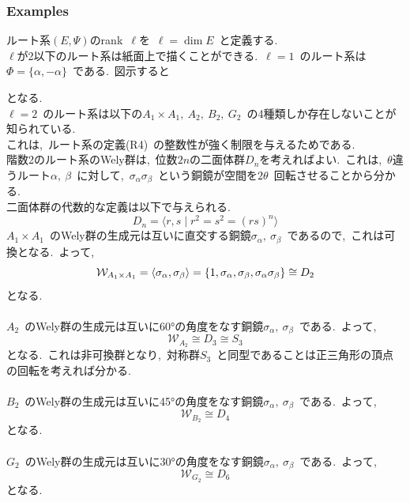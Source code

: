 \documentclass[uplatex,dvipdfmx]{jsarticle}
\begin{document}
\subsubsection{Examples}
ルート系$(E,\Psi)$のrank~$\ell$を~$\ell = \dim E$~と定義する.~\\
$\ell$が2以下のルート系は紙面上で描くことができる.~$\ell = 1$~のルート系は$\Phi = \{\alpha, -\alpha\}$~である.~図示すると
\begin{center}
\end{center}
となる.\\
$\ell = 2$~のルート系は以下の$A_1 \times A_1,~A_2,~B_2,~G_2$~の4種類しか存在しないことが知られている.\\
これは,~ルート系の定義(R4)~の整数性が強く制限を与えるためである.\\
階数2のルート系のWely群は,~位数$2n$の二面体群$D_{n}$を考えればよい.~これは,~$\theta$違うルート$\alpha,~\beta$~に対して,~$\sigma_\alpha \sigma_\beta$~という銅鏡が空間を$2\theta$~回転させることから分かる.\\
二面体群の代数的な定義は以下で与えられる.
\begin{equation*}
        D_{n} = \langle r, s \mid r^2 = s^2 = (rs)^n  \rangle
\end{equation*}
$A_1 \times A_1$~のWely群の生成元は互いに直交する銅鏡$\sigma_\alpha,~\sigma_\beta$~であるので,~これは可換となる.~よって,
\begin{equation*}
    \mathcal{W}_{A_1 \times A_1} =\ev{\sigma_\alpha,\sigma_\beta}=  \{1, \sigma_\alpha, \sigma_\beta, \sigma_\alpha \sigma_\beta\} \cong D_2
\end{equation*}
となる.\\\\
$A_2$~のWely群の生成元は互いに60°の角度をなす銅鏡$\sigma_\alpha,~\sigma_\beta$~である.~よって,
\begin{equation*}
    \mathcal{W}_{A_2} \cong D_3 \cong S_3
\end{equation*}
となる.~これは非可換群となり,~対称群$S_3$~と同型であることは正三角形の頂点の回転を考えれば分かる.\\\\
$B_2$~のWely群の生成元は互いに45°の角度をなす銅鏡$\sigma_\alpha,~\sigma_\beta$~である.~よって,
\begin{equation*}
    \mathcal{W}_{B_2} \cong D_4
\end{equation*}
となる.\\\\
$G_2$~のWely群の生成元は互いに30°の角度をなす銅鏡$\sigma_\alpha,~\sigma_\beta$~である.~よって,
\begin{equation*}
    \mathcal{W}_{G_2} \cong D_6
\end{equation*}
となる.
\newpage
\end{document}
